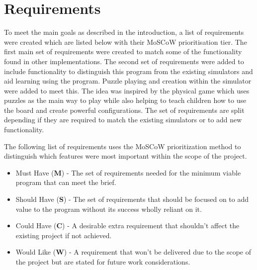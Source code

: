 \documentclass{l4proj}
\begin{document}
\section{Requirements}
To meet the main goals as described in the introduction, a list of requirements were created which are listed below with their MoSCoW \citep{noauthor_moscow_nodate} prioritisation tier. The first main set of requirements were created to match some of the functionality found in other implementations. The second set of requirements were added to include functionality to distinguish this program from the existing simulators and aid learning using the program. Puzzle playing and creation within the simulator were added to meet this. The idea was inspired by the physical game which uses puzzles as the main way to play while also helping to teach children how to use the board and create powerful configurations. The set of requirements are split depending if they are required to match the existing simulators or to add new functionality.

The following list of requirements uses the MoSCoW prioritization method to distinguish which features were most important within the scope of the project. 
\begin{itemize}
    \item Must Have (\textbf{M}) - The set of requirements needed for the minimum viable program that can meet the brief.
    \item Should Have (\textbf{S}) - The set of requirements that should be focused on to add value to the program without its success wholly reliant on it.
    \item Could Have (\textbf{C}) - A desirable extra requirement that shouldn't affect the existing project if not achieved.
    \item Would Like (\textbf{W}) - A requirement that won't be delivered due to the scope of the project but are stated for future work considerations.
\end{itemize}
\end{document}
